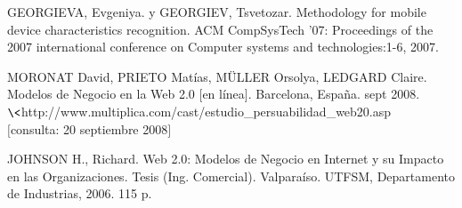 \renewcommand\bibname{Referencias}
\begin{thebibliography}{99}

 GEORGIEVA, Evgeniya. y GEORGIEV, Tsvetozar. Methodology for mobile device characteristics recognition. ACM CompSysTech '07: Proceedings of the 2007 international conference on Computer systems and technologies:1-6, 2007.

MORONAT David, PRIETO Matías, MÜLLER Orsolya, LEDGARD Claire. Modelos de Negocio en la Web 2.0 [en línea]. Barcelona, España. sept 2008.\\
$\<$http://www.multiplica.com/cast/estudio\_persuabilidad\_web20.asp$\>$\\
$[$consulta: 20 septiembre 2008$]$

JOHNSON H., Richard. Web 2.0: Modelos de Negocio en Internet y su Impacto en las Organizaciones. Tesis (Ing. Comercial). Valparaíso. UTFSM, Departamento de Industrias, 2006. 115 p.

\end{thebibliography}
